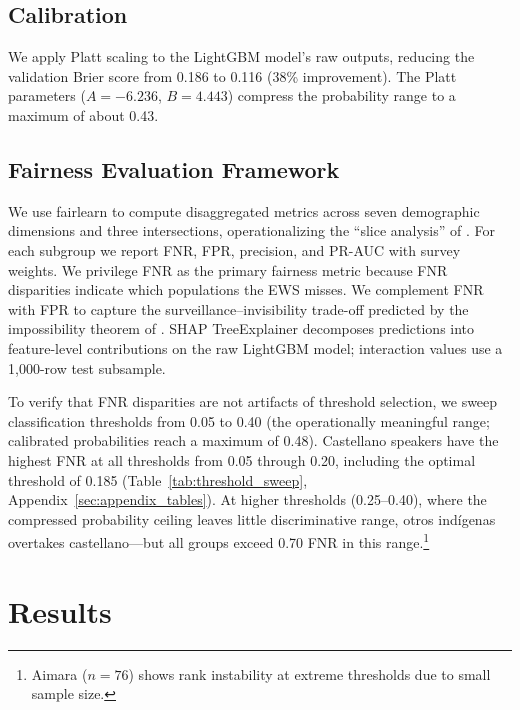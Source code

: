 \documentclass[notitlepage,12pt]{jedm}
\begin{document}
\subsection{Calibration}

We apply Platt scaling \cite{platt1999probabilistic} to the LightGBM model's raw outputs, reducing the validation Brier score from 0.186 to 0.116 (38\% improvement). The Platt parameters ($A=-6.236$, $B=4.443$) compress the probability range to a maximum of about 0.43.

\subsection{Fairness Evaluation Framework}

We use fairlearn \cite{bird2020fairlearn} to compute disaggregated metrics across seven demographic dimensions and three intersections, operationalizing the ``slice analysis'' of . For each subgroup we report FNR, FPR, precision, and PR-AUC with survey weights. We privilege FNR as the primary fairness metric because FNR disparities indicate which populations the EWS misses. We complement FNR with FPR to capture the surveillance--invisibility trade-off predicted by the impossibility theorem of . SHAP TreeExplainer \cite{lundberg2020local} decomposes predictions into feature-level contributions on the raw LightGBM model; interaction values use a 1,000-row test subsample.

To verify that FNR disparities are not artifacts of threshold selection, we sweep classification thresholds from 0.05 to 0.40 (the operationally meaningful range; calibrated probabilities reach a maximum of 0.48). Castellano speakers have the highest FNR at all thresholds from 0.05 through 0.20, including the optimal threshold of 0.185 (Table~\ref{tab:threshold_sweep}, Appendix~\ref{sec:appendix_tables}). At higher thresholds (0.25--0.40), where the compressed probability ceiling leaves little discriminative range, otros ind\'{i}genas overtakes castellano---but all groups exceed 0.70 FNR in this range.\footnote{Aimara ($n=76$) shows rank instability at extreme thresholds due to small sample size.}

\section{Results}
\end{document}
